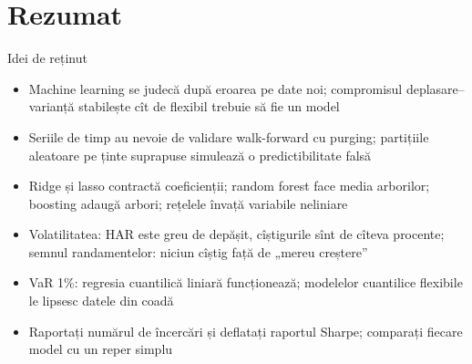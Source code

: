 \section{Rezumat}

\begin{frame}{Idei de reținut}
\itemsize{\small}
\begin{itemize}
    \item Machine learning se judecă după eroarea pe date noi; compromisul deplasare--varianță stabilește cît de flexibil trebuie să fie un model
    \item Seriile de timp au nevoie de validare walk-forward cu purging; partițiile aleatoare pe ținte suprapuse simulează o predictibilitate falsă
    \item Ridge și lasso contractă coeficienții; random forest face media arborilor; boosting adaugă arbori; rețelele învață variabile neliniare
    \item Volatilitatea: HAR este greu de depășit, cîștigurile sînt de cîteva procente; semnul randamentelor: niciun cîștig față de „mereu creștere”
    \item VaR 1\%: regresia cuantilică liniară funcționează; modelelor cuantilice flexibile le lipsesc datele din coadă
    \item Raportați numărul de încercări și deflatați raportul Sharpe; comparați fiecare model cu un reper simplu
\end{itemize}
\end{frame}

